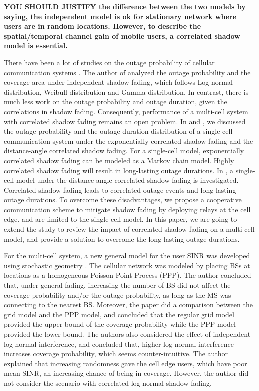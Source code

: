 \documentclass[journal,10pt]{IEEEtran}
\begin{document}
{\bf YOU SHOULD JUSTIFY the difference between the two models by saying, the independent model is ok for stationary network where users are in random locations. However, to describe the spatial/temporal channel gain of mobile users, a correlated shadow model is essential.}

\par There have been a lot of studies on the outage probability of cellular communication systems \cite{abu1991outage, petrovic2013outage, emamian2014outage}. The author of \cite{vural2015effect} analyzed the outage probability and the coverage area under independent shadow fading, which follows Log-normal distribution, Weibull distribution and Gamma distribution. In contrast, there is much less work on the outage probability and outage duration, given the correlations in shadow fading. Consequently, performance of a multi-cell system with correlated shadow fading remains an open problem. In \cite{lu2015long} and \cite{lu2015shining}, we discussed the outage probability and the outage duration distribution of a single-cell communication system under the exponentially correlated shadow fading and the distance-angle correlated shadow fading. For a single-cell model, exponentially correlated shadow fading can be modeled as a Markov chain model. Highly correlated shadow fading will result in long-lasting outage durations. In \cite{lu2015shining}, a single-cell model under the distance-angle correlated shadow fading is investigated. Correlated shadow fading leads to correlated outage events and long-lasting outage durations. To overcome these disadvantages, we propose a cooperative communication scheme to mitigate shadow fading by deploying relays at the cell edge. \cite{lu2015long} and \cite{lu2015shining} are limited to the single-cell model. In this paper, we are going to extend the study to review the impact of correlated shadow fading on a multi-cell model, and provide a solution to overcome the long-lasting outage durations.
\par For the multi-cell system, a new general model for the user SINR was developed using stochastic geometry \cite{andrews2011tractable}. The cellular network was modeled by placing BSs at locations as a homogeneous Poisson Point Process (PPP). The author concluded that, under general fading, increasing the number of BS did not affect the coverage probability and/or the outage probability, as long as the MS was connecting to the nearest BS. Moreover, the paper did a comparison between the grid model and the PPP model, and concluded that the regular grid model provided the upper bound of the coverage probability while the PPP model provided the lower bound. The authors also considered the effect of independent log-normal interference, and concluded that, higher log-normal interference increases coverage probability, which seems counter-intuitive. The author explained that increasing randomness gave the cell edge users, which have poor mean SINR, an increasing chance of being in coverage. However, the author did not consider the scenario with correlated log-normal shadow fading. 
\end{document}
